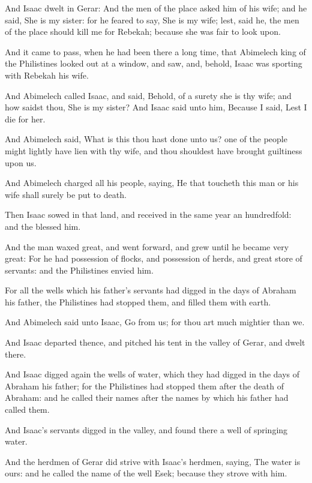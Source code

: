 \verse And Isaac dwelt in Gerar: \verse And the men of the place asked him
of his wife; and he said, She is my sister: for he feared to say, She
is my wife; lest, said he, the men of the place should kill me for
Rebekah; because she was fair to look upon.

\verse And it came to pass, when he had been there a long time, that
Abimelech king of the Philistines looked out at a window, and saw,
and, behold, Isaac was sporting with Rebekah his wife.

\verse And Abimelech called Isaac, and said, Behold, of a surety she is
thy wife; and how saidst thou, She is my sister? And Isaac said unto
him, Because I said, Lest I die for her.

\verse And Abimelech said, What is this thou hast done unto us? one of
the people might lightly have lien with thy wife, and thou shouldest
have brought guiltiness upon us.

\verse And Abimelech charged all his people, saying, He that toucheth
this man or his wife shall surely be put to death.

\verse Then Isaac sowed in that land, and received in the same year an
hundredfold: and the \LORD blessed him.

\verse And the man waxed great, and went forward, and grew until he
became very great: \verse For he had possession of flocks, and
possession of herds, and great store of servants: and the Philistines
envied him.

\verse For all the wells which his father's servants had digged in the
days of Abraham his father, the Philistines had stopped them, and
filled them with earth.

\verse And Abimelech said unto Isaac, Go from us; for thou art much
mightier than we.

\verse And Isaac departed thence, and pitched his tent in the valley of
Gerar, and dwelt there.

\verse And Isaac digged again the wells of water, which they had digged
in the days of Abraham his father; for the Philistines had stopped
them after the death of Abraham: and he called their names after the
names by which his father had called them.

\verse And Isaac's servants digged in the valley, and found there a
well of springing water.

\verse And the herdmen of Gerar did strive with Isaac's herdmen,
saying, The water is ours: and he called the name of the well Esek;
because they strove with him.


